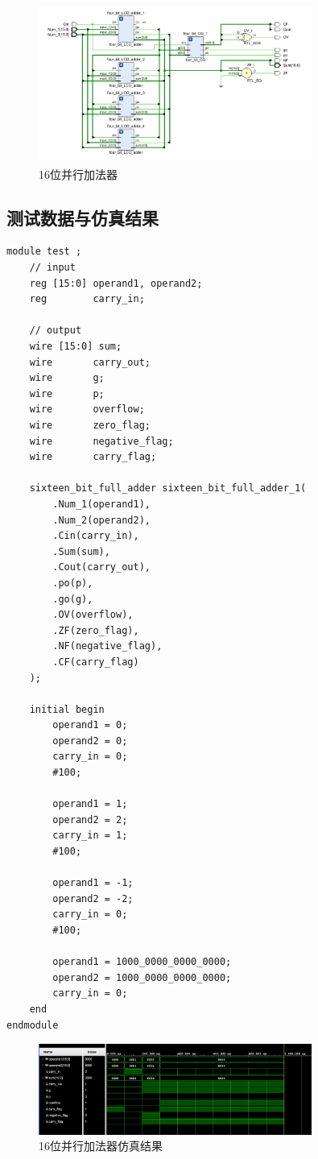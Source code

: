 \documentclass[AutoFakeBold]{LZUThesis}
\begin{document}
    \begin{figure}[htbp]
        \centering
        \includegraphics[width=0.8\textwidth]{./img/16bitadder}
        \caption{16位并行加法器}
    \end{figure}

\subsection{测试数据与仿真结果}
    \begin{lstlisting}
module test ;
    // input 
    reg [15:0] operand1, operand2;
    reg        carry_in;
    
    // output
    wire [15:0] sum;
    wire       carry_out;
    wire       g;
    wire       p;
    wire       overflow;
    wire       zero_flag;
    wire       negative_flag;
    wire       carry_flag;

    sixteen_bit_full_adder sixteen_bit_full_adder_1(
        .Num_1(operand1),
        .Num_2(operand2),
        .Cin(carry_in),
        .Sum(sum),
        .Cout(carry_out),
        .po(p),
        .go(g),
        .OV(overflow),
        .ZF(zero_flag),
        .NF(negative_flag),
        .CF(carry_flag)
    );

    initial begin 
        operand1 = 0;
        operand2 = 0;
        carry_in = 0;
        #100;

        operand1 = 1;
        operand2 = 2;
        carry_in = 1;
        #100;

        operand1 = -1;
        operand2 = -2;
        carry_in = 0;
        #100;

        operand1 = 1000_0000_0000_0000;
        operand2 = 1000_0000_0000_0000;
        carry_in = 0;
    end
endmodule

    \end{lstlisting}

    \begin{figure}[htbp]
        \centering
        \includegraphics[width=0.8\textwidth]{./img/16bitadder_simulate}
        \caption{16位并行加法器仿真结果}
        \label{fig:16bitadder_simulate}
    \end{figure}
\end{document}
